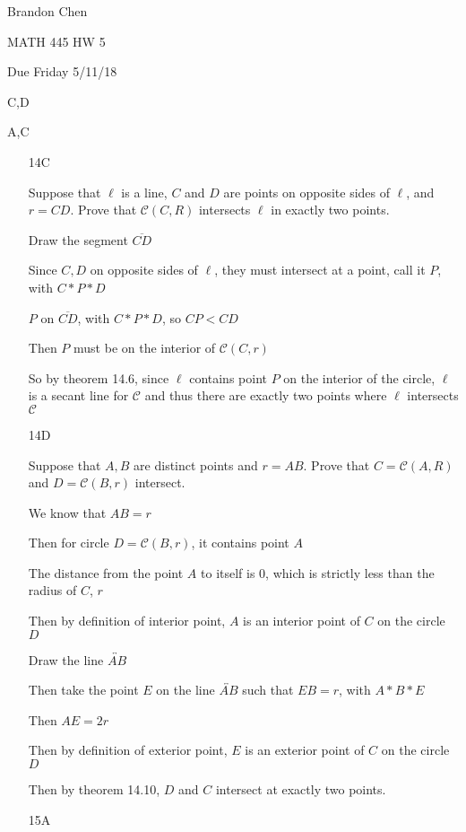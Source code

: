 \documentclass[11pt]{article}
\newcommand{\lines}[1]{\overleftrightarrow{#1}}
\newcommand{\segment}[1]{\overline{#1}}
\begin{document}
\noindent Brandon Chen

\noindent MATH 445 HW 5

\noindent Due Friday 5/11/18

 C,D

 A,C

\begin{itemize}

	\item[14C]

		Suppose that $\ell$ is a line, $C$ and $D$ are points on opposite sides of $\ell$, and $r = CD$. Prove that $\mathscr{C}(C,R)$ intersects $\ell$ in exactly two points.

		Draw the segment $\segment{CD}$

		Since $C,D$ on opposite sides of $\ell$, they must intersect at a point, call it $P$, with $C * P * D$

		$P$ on $\segment{CD}$, with $C * P * D$, so $CP < CD$

		Then $P$ must be on the interior of $\mathscr{C}(C,r)$

		So by theorem 14.6, since $\ell$ contains point $P$ on the interior of the circle, $\ell$ is a secant line for $\mathscr{C}$ and thus there are exactly two points where $\ell$ intersects $\mathscr{C}$

	\item[14D]

		Suppose that $A,B$ are distinct points and $r = AB$. Prove that $C = \mathscr{C}(A,R)$ and $D = \mathscr{C}(B,r)$ intersect. 

		We know that $AB = r$

		Then for circle $D = \mathscr{C}(B,r)$, it contains point $A$

		The distance from the point $A$ to itself is 0, which is strictly less than the radius of $C$, $r$

		Then by definition of interior point, $A$ is an interior point of $C$ on the circle $D$

		Draw the line $\lines{AB}$

		Then take the point $E$ on the line $\lines{AB}$ such that $EB = r$, with $A * B * E$

		Then $AE = 2r$

		Then by definition of exterior point, $E$ is an exterior point of $C$ on the circle $D$

		Then by theorem 14.10, $D$ and $C$ intersect at exactly two points.

	\item[15A]


\end{itemize}
\end{document}
